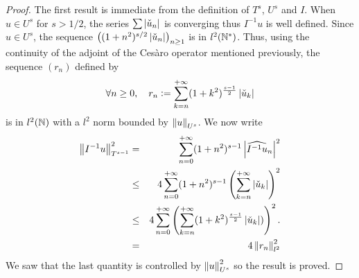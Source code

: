 \documentclass[a4paper]{article}
\begin{document}
\begin{proof}
	The first result is immediate from the definition of $T^s$, $U^s$ and $I$. 
	When $u \in U^{s}$ for $s > 1/2$, the series $\sum \left\lvert \check{u}_n \right\rvert$ is converging thus $I^{-1}u$ is well defined.
	Since $u \in U^s$, the sequence $\left((1+n^2)^{s/2} \left\lvert \check{u}_n \right\rvert\right)_{n \geq 1}$ is in $l^2(\mathbb{N}^*)$. Thus, using the continuity of the adjoint of the Cesàro operator mentioned previously, the sequence $(r_n)$ defined by 
	\[\forall n \geq 0, \quad r_n \mathrel{\mathop:}= \sum_{k=n}^{+ \infty} (1+k^2)^{\frac{s-1}{2}} \left\lvert \check{u}_k \right\rvert \] is in $l^2(\mathbb{N})$ with a $l^2$ norm bounded by $\left\|u\right\|_{U^s}$. We now write
	\begin{eqnarray*}
		\left\|I^{-1} u\right\|_{T^{s-1}}^2 &=& \sum_{n=0}^{+ \infty} (1 + n^2)^{s-1} \left\lvert \widehat{I^{-1} u}_n \right\rvert^2\\ 
		&\leq& 4\sum_{n=0}^{+\infty}(1+n^2)^{s-1} \left(\sum_{k=n}^{+\infty} \left\lvert \check{u}_k \right\rvert\right)^2 \\
		&\leq& 4\sum_{n=0}^{+ \infty}\left(\sum_{k=n}^{+\infty}(1+k^2)^{\frac{s-1}{2}} \left\lvert \check{u}_k \right\rvert)\right)^2.\\
		&=& 4\left\|r_n\right\|^2_{l^2}
	\end{eqnarray*}	
	We saw that the last quantity is controlled by $\left\|u\right\|_{U^s}^2$ so the result is proved.
\end{proof}
\noindent {}
\end{document}
